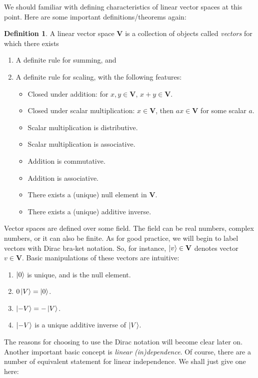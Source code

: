 \documentclass{book}
\theoremstyle{definition}
\newtheorem{defn}{Definition}[section]
\newcommand{\V}{\mathbf{V}}
\begin{document}
We should familiar with defining characteristics of linear vector spaces at this point. Here are some important definitions/theorems again:

\begin{defn}
	A linear vector space $\textbf{V}$ is a collection of objects called \textit{vectors} for which there exists
	
	\begin{enumerate}
		\item A definite rule for summing, and
		\item A definite rule for scaling, with the following features:
		
		
		\begin{itemize}
			\item Closed under addition: for $x,y \in \V$, $x+y \in \V$.
			\item Closed under scalar multiplication: $x\in \V$, then $ax \in \V$ for some scalar $a$.
			\item Scalar multiplication is distributive. 
			\item Scalar multiplication is associative.
			\item Addition is commutative.
			\item Addition is associative.
			\item There exists a (unique) null element in $\V$.
			\item There exists a (unique) additive inverse. 
		\end{itemize}
	\end{enumerate}
\end{defn}


Vector spaces are defined over some field. The field can be real numbers, complex numbers, or it can also be finite. As for good practice, we will begin to label vectors with Dirac bra-ket notation. So, for instance, $\ket{v} \in \V$ denotes vector $v \in \V$. Basic manipulations of these vectors are intuitive:
\begin{enumerate}
	\item $\ket{0}$ is unique, and is the null element.
	\item $0\ket{V} = \ket{0}$.
	\item $\ket{-V} = -\ket{V}$.
	\item $\ket{-V}$ is a unique additive inverse of $\ket{V}$.
\end{enumerate} 

The reasons for choosing to use the Dirac notation will become clear later on. Another important basic concept is \textit{linear (in)dependence}. Of course, there are a number of equivalent statement for linear independence. We shall just give one here:
\end{document}
